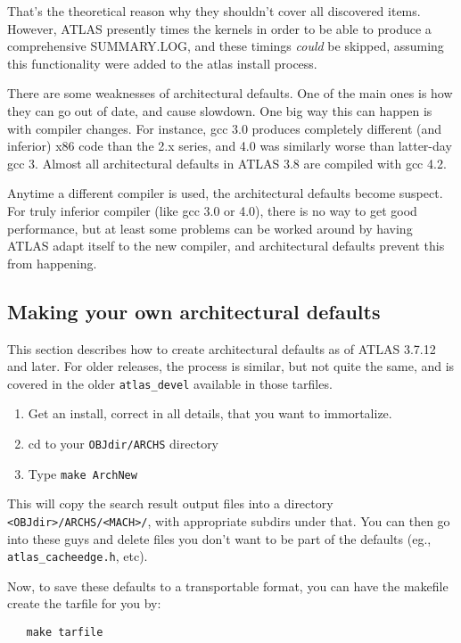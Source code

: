 \documentclass[11pt]{article}
\begin{document}
That's the theoretical reason why they shouldn't cover all discovered items.
However, ATLAS presently times the kernels in order to be able to
produce a comprehensive SUMMARY.LOG, and these timings {\em could} be skipped,
assuming this functionality were added to the atlas install process.

There are some weaknesses of architectural defaults.  One of the main ones
is how they can go out of date, and cause slowdown.  One big way this can
happen is with compiler changes.  For instance, gcc 3.0 produces completely
different (and inferior) x86 code than the 2.x series, and 4.0 was similarly
worse than latter-day gcc 3.  Almost all architectural defaults in ATLAS 3.8
are compiled with gcc 4.2.  

Anytime a different compiler is used, the architectural defaults become
suspect.  For truly inferior compiler (like gcc 3.0 or 4.0), there is no
way to get good performance, but at least some problems can be worked
around by having ATLAS adapt itself to the new compiler, and architectural
defaults prevent this from happening.

\subsection{Making your own architectural defaults}
This section describes how to create architectural defaults as of ATLAS
3.7.12 and later.  For older releases, the process is similar, but not quite
the same, and is covered in the older {\tt atlas\_devel} available in
those tarfiles.
\begin{enumerate}
\item Get an install, correct in all details, that you want to immortalize.
\item cd to your {\tt OBJdir/ARCHS} directory
\item Type {\tt make ArchNew}
\end{enumerate}

This will copy the search result output files into a directory
{\tt <OBJdir>/ARCHS/<MACH>/}, with appropriate subdirs under
that.  You can then go into these guys and delete files you don't want to
be part of the defaults (eg., {\tt atlas\_cacheedge.h}, etc).

Now, to save these defaults to a transportable format, you can have the
makefile create the tarfile for you by:
\begin{verbatim}
   make tarfile
\end{verbatim}
\end{document}
